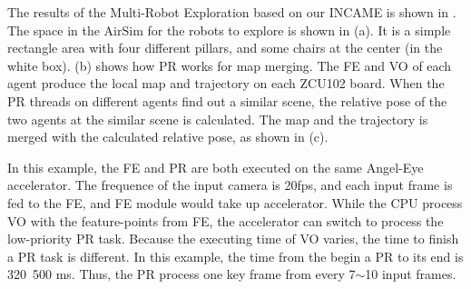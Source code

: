 The results of the Multi-Robot Exploration based on our INCAME is shown in . The space in the AirSim for the robots to explore is shown in (a). It is a simple rectangle area with four different pillars, and some chairs at the center (in the white box).  (b) shows how PR works for map merging. The FE and VO of each agent produce the local map and trajectory on each ZCU102 board. When the PR threads on different agents find out a similar scene, the relative pose of the two agents at the similar scene is calculated. The map and the trajectory is merged with the calculated relative pose, as shown in (c).

In this example, the FE and PR are both executed on the same Angel-Eye accelerator. The frequence of the input camera is 20fps, and each input frame is fed to the FE, and FE module would take up accelerator. While the CPU process VO with the feature-points from FE, the accelerator can switch to process the low-priority PR task. Because the executing time of VO varies, the time to finish a PR task is different. In this example, the time from the begin a PR to its end is 320~500 ms. Thus, the PR process one key frame from every 7$\sim$10 input frames.